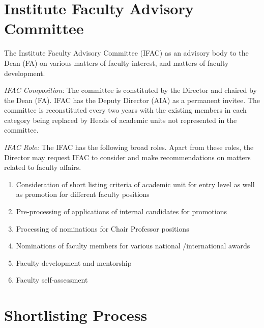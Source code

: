 \documentclass[
  10pt,
  a5paper,
  10pt,
  openany]{amsbook}
\providecommand{\tightlist}{%
  \setlength{\itemsep}{0pt}\setlength{\parskip}{0pt}}
\begin{document}
\section{Institute Faculty Advisory
Committee}\label{institute-faculty-advisory-committee}

The Institute Faculty Advisory Committee (IFAC) as an advisory body to
the Dean (FA) on various matters of faculty interest, and matters of
faculty development.

\emph{IFAC Composition:} The committee is constituted by the Director
and chaired by the Dean (FA). IFAC has the Deputy Director (AIA) as a
permanent invitee. The committee is reconstituted every two years with
the existing members in each category being replaced by Heads of
academic units not represented in the committee.

\emph{IFAC Role:} The IFAC has the following broad roles. Apart from
these roles, the Director may request IFAC to consider and make
recommendations on matters related to faculty affairs.

\begin{enumerate}
\def\labelenumi{\arabic{enumi}.}
\tightlist
\item
  Consideration of short listing criteria of academic unit for entry
  level as well as promotion for different faculty positions
\item
  Pre-processing of applications of internal candidates for promotions
\item
  Processing of nominations for Chair Professor positions
\item
  Nominations of faculty members for various national /international
  awards
\item
  Faculty development and mentorship
\item
  Faculty self-assessment
\end{enumerate}

\section{Shortlisting Process}\label{shortlisting-process}
\end{document}
